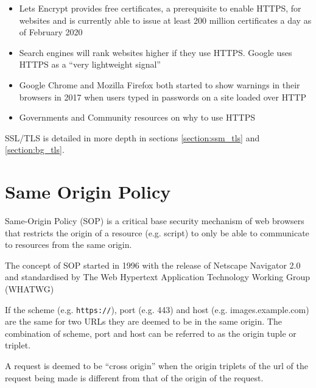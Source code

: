 \documentclass{mscreport}
\begin{document}
\begin{itemize}
	\setlength\itemsep{0.1em}
	\item Lets Encrypt provides free certificates, a prerequisite to enable HTTPS, for websites and is currently able to issue at least 200 million certificates a day as of February 2020 \cite{noauthor_undated-bi}
	\item Search engines will rank websites higher if they use HTTPS. Google uses HTTPS as a ``very lightweight signal'' \cite{noauthor_undated-im}
	\item Google Chrome and Mozilla Firefox both started to show warnings in their browsers in 2017 when users typed in passwords on a site loaded over HTTP \cite{Vyas2017-ds,Google_undated-ws}
	\item Governments and Community resources on why to use HTTPS \cite{noauthor_undated-oz,noauthor_undated-xk}
\end{itemize}

\noindent
SSL/TLS is detailed in more depth in sections \ref{section:ssm_tls} and \ref{section:bg_tls}.

\section{Same Origin Policy}
\label{section:same_origin_policy}
\vspace{0.3cm} \noindent
Same-Origin Policy (SOP) is a critical base security mechanism of web browsers that restricts the origin of a resource (e.g. script) to only be able to communicate to resources from the same origin.

\vspace{0.3cm} \noindent
The concept of SOP started in 1996 with the release of Netscape Navigator 2.0 \cite{Preston2012-cs} and standardised by The Web Hypertext Application Technology Working Group (WHATWG) \cite{Multiple1996-ju}

\vspace{0.3cm} \noindent
If the scheme (e.g. \texttt{https://}), port (e.g. 443) and host (e.g. images.example.com) are the same for two URLs they are deemed to be in the same origin. The combination of scheme, port and host can be referred to as the origin tuple or triplet.

\vspace{0.3cm} \noindent
A request is deemed to be ``cross origin'' when the origin triplets of the url of the request being made is different from that of the origin of the request.
\end{document}
